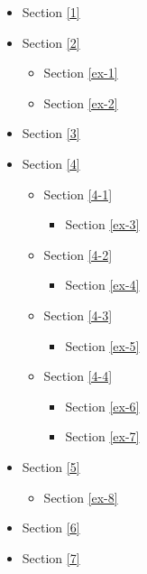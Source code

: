 \documentclass[11pt]{article}
\providecommand{\tightlist}{%
      \setlength{\itemsep}{0pt}\setlength{\parskip}{0pt}}
\begin{document}
\begin{itemize}
\tightlist
\item
  Section \ref{1}
\item
  Section \ref{2}

  \begin{itemize}
  \tightlist
  \item
    Section \ref{ex-1}
  \item
    Section \ref{ex-2}
  \end{itemize}
\item
  Section \ref{3}
\item
  Section \ref{4}

  \begin{itemize}
  \tightlist
  \item
    Section \ref{4-1}

    \begin{itemize}
    \tightlist
    \item
      Section \ref{ex-3}
    \end{itemize}
  \item
    Section \ref{4-2}

    \begin{itemize}
    \tightlist
    \item
      Section \ref{ex-4}
    \end{itemize}
  \item
    Section \ref{4-3}

    \begin{itemize}
    \tightlist
    \item
      Section \ref{ex-5}
    \end{itemize}
  \item
    Section \ref{4-4}

    \begin{itemize}
    \tightlist
    \item
      Section \ref{ex-6}
    \item
      Section \ref{ex-7}
    \end{itemize}
  \end{itemize}
\item
  Section \ref{5}

  \begin{itemize}
  \tightlist
  \item
    Section \ref{ex-8}
  \end{itemize}
\item
  Section \ref{6}
\item
  Section \ref{7}
\end{itemize}
\end{document}

